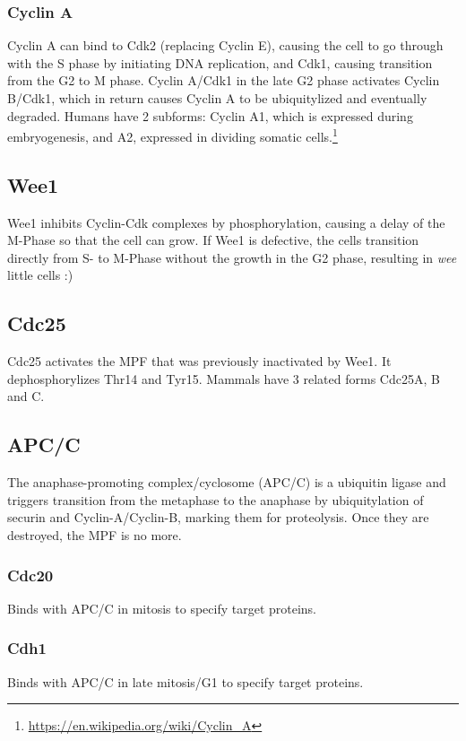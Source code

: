\documentclass{article}
\begin{document}
	\subsubsection{Cyclin A}
	Cyclin A can bind to Cdk2 (replacing Cyclin E), causing the cell to go through with the S phase by initiating DNA replication, and Cdk1, causing transition from the G2 to M phase. Cyclin A/Cdk1 in the late G2 phase activates Cyclin B/Cdk1, which in return causes Cyclin A to be ubiquitylized and eventually degraded. Humans have 2 subforms: Cyclin A1, which is expressed during embryogenesis, and A2, expressed in dividing somatic cells.\footnote{\url{https://en.wikipedia.org/wiki/Cyclin_A}}\\
	
	\subsection{Wee1}
	Wee1 inhibits Cyclin-Cdk complexes by phosphorylation, causing a delay of the M-Phase so that the cell can grow. If Wee1 is defective, the cells transition directly from S- to M-Phase without the growth in the G2 phase, resulting in \textit{wee} little cells :)
	
	\subsection{Cdc25}
	Cdc25 activates the MPF that was previously inactivated by Wee1. It dephosphorylizes Thr14 and Tyr15. Mammals have 3 related forms Cdc25A, B and C.
	
	\subsection{APC/C}
	The anaphase-promoting complex/cyclosome (APC/C) is a ubiquitin ligase and triggers transition from the metaphase to the anaphase by ubiquitylation of securin and Cyclin-A/Cyclin-B, marking them for proteolysis. Once they are destroyed, the MPF is no more.
	
	\subsubsection{Cdc20}
	Binds with APC/C in mitosis to specify target proteins.
	
	\subsubsection{Cdh1}
	Binds with APC/C in late mitosis/G1 to specify target proteins.
	
\end{document}

